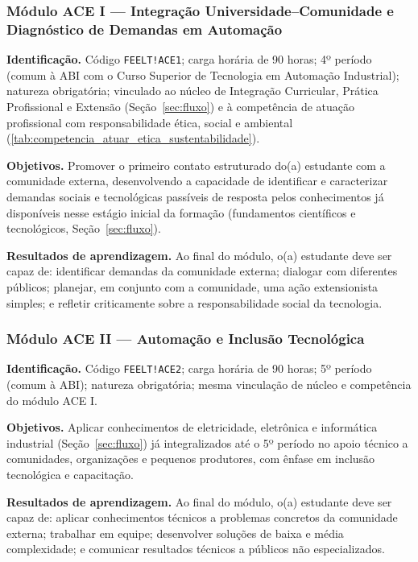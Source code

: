 \subsubsection{Módulo ACE I --- Integração Universidade--Comunidade e Diagnóstico de Demandas em Automação}
\label{sec:ace1}

\textbf{Identificação.} Código \texttt{FEELT!ACE1}; carga horária de 90 horas; 4º período (comum à ABI com o Curso Superior de Tecnologia em Automação Industrial); natureza obrigatória; vinculado ao núcleo de Integração Curricular, Prática Profissional e Extensão (Seção~\ref{sec:fluxo}) e à competência de atuação profissional com responsabilidade ética, social e ambiental (\autoref{tab:competencia_atuar_etica_sustentabilidade}\unskip).

\textbf{Objetivos.} Promover o primeiro contato estruturado do(a) estudante com a comunidade externa, desenvolvendo a capacidade de identificar e caracterizar demandas sociais e tecnológicas passíveis de resposta pelos conhecimentos já disponíveis nesse estágio inicial da formação (fundamentos científicos e tecnológicos, Seção~\ref{sec:fluxo}).

\textbf{Resultados de aprendizagem.} Ao final do módulo, o(a) estudante deve ser capaz de: identificar demandas da comunidade externa; dialogar com diferentes públicos; planejar, em conjunto com a comunidade, uma ação extensionista simples; e refletir criticamente sobre a responsabilidade social da tecnologia.

\subsubsection{Módulo ACE II --- Automação e Inclusão Tecnológica}
\label{sec:ace2}

\textbf{Identificação.} Código \texttt{FEELT!ACE2}; carga horária de 90 horas; 5º período (comum à ABI); natureza obrigatória; mesma vinculação de núcleo e competência do módulo ACE I.

\textbf{Objetivos.} Aplicar conhecimentos de eletricidade, eletrônica e informática industrial (Seção~\ref{sec:fluxo}) já integralizados até o 5º período no apoio técnico a comunidades, organizações e pequenos produtores, com ênfase em inclusão tecnológica e capacitação.

\textbf{Resultados de aprendizagem.} Ao final do módulo, o(a) estudante deve ser capaz de: aplicar conhecimentos técnicos a problemas concretos da comunidade externa; trabalhar em equipe; desenvolver soluções de baixa e média complexidade; e comunicar resultados técnicos a públicos não especializados.

